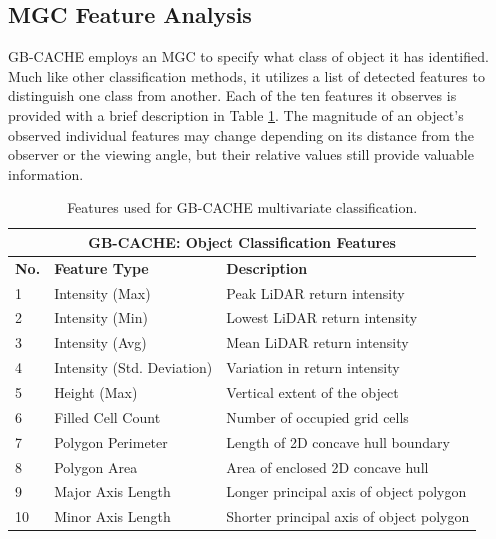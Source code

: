 \subsection{MGC Feature Analysis} \label{features_gbcache}

GB-CACHE employs an \acl{MGC} to specify what class of object it has identified. 
Much like other classification methods, it utilizes a list of detected features to distinguish one class from another.
Each of the ten features it observes is provided with a brief description in Table \ref{tab:gbcache_features}.
The magnitude of an object's observed individual features may change depending on its distance from the observer or the viewing angle, but their relative values still provide valuable information.

\begin{table}[htbp]
\centering
\begin{tabular}{lll}
\hline
\multicolumn{3}{c}{GB-CACHE: Object Classification Features}\\
\hline
\hline
\textbf{No.} & \textbf{Feature Type} & \textbf{Description} \\ 
\hline
1 & Intensity (Max) & Peak LiDAR return intensity \\
2 & Intensity (Min) & Lowest LiDAR return intensity \\
3 & Intensity (Avg) & Mean LiDAR return intensity \\
4 & Intensity (Std. Deviation) & Variation in return intensity \\
5 & Height (Max) & Vertical extent of the object \\
6 & Filled Cell Count & Number of occupied grid cells \\
7 & Polygon Perimeter & Length of 2D concave hull boundary \\
8 & Polygon Area & Area of enclosed 2D concave hull \\
9 & Major Axis Length & Longer principal axis of object polygon \\
10 & Minor Axis Length & Shorter principal axis of object polygon \\
\hline
\end{tabular}
\caption{Features used for GB-CACHE multivariate classification.}
\label{tab:gbcache_features}
\end{table}

